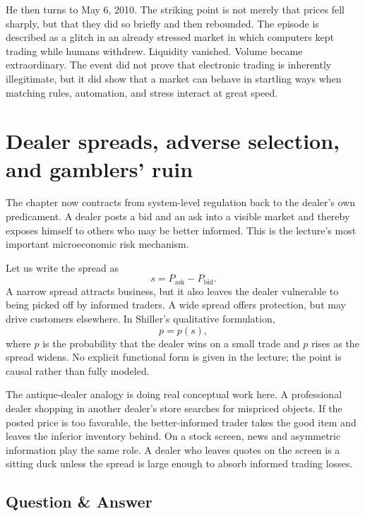 He then turns to May 6, 2010. The striking point is not merely that prices fell sharply, but that they did so briefly and then rebounded. The episode is described as a glitch in an already stressed market in which computers kept trading while humans withdrew. Liquidity vanished. Volume became extraordinary. The event did not prove that electronic trading is inherently illegitimate, but it did show that a market can behave in startling ways when matching rules, automation, and stress interact at great speed.

\section{Dealer spreads, adverse selection, and gamblers' ruin}

The chapter now contracts from system-level regulation back to the dealer's own predicament. A dealer posts a bid and an ask into a visible market and thereby exposes himself to others who may be better informed. This is the lecture's most important microeconomic risk mechanism.

Let us write the spread as
\begin{equation}
s=P_{\text{ask}}-P_{\text{bid}}.
\end{equation}
A narrow spread attracts business, but it also leaves the dealer vulnerable to being picked off by informed traders. A wide spread offers protection, but may drive customers elsewhere. In Shiller's qualitative formulation,
\begin{equation}
p = p(s),
\end{equation}
where \(p\) is the probability that the dealer wins on a small trade and \(p\) rises as the spread widens. No explicit functional form is given in the lecture; the point is causal rather than fully modeled.

The antique-dealer analogy is doing real conceptual work here. A professional dealer shopping in another dealer's store searches for mispriced objects. If the posted price is too favorable, the better-informed trader takes the good item and leaves the inferior inventory behind. On a stock screen, news and asymmetric information play the same role. A dealer who leaves quotes on the screen is a sitting duck unless the spread is large enough to absorb informed trading losses.

\subsection{Question \& Answer}


